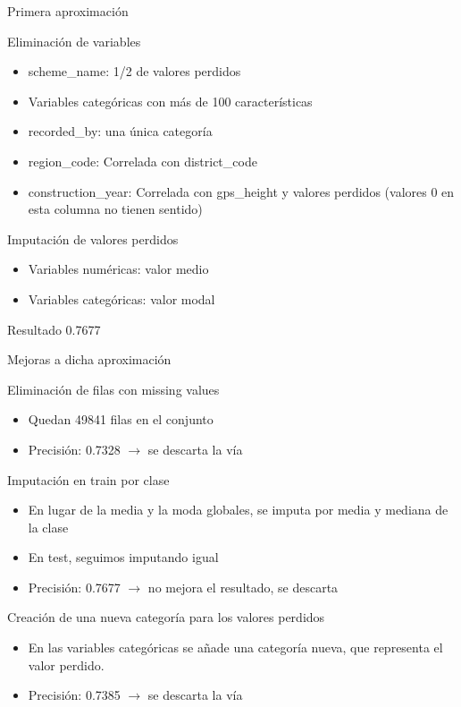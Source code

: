 \begin{frame}{Primera aproximación}
  \begin{block}{Eliminación de variables}
    \begin{itemize}
    \item scheme\_name: 1/2 de valores perdidos
    \item Variables categóricas con más de 100 características
    \item recorded\_by: una única categoría
    \item region\_code: Correlada con district\_code
    \item construction\_year: Correlada con gps\_height y valores perdidos
      (valores 0 en esta columna no tienen sentido)
    \end{itemize}
  \end{block}
  \begin{block}{Imputación de valores perdidos}
    \begin{itemize}
    \item Variables numéricas: valor medio
    \item Variables categóricas: valor modal
    \end{itemize}
  \end{block}
  \begin{block}{Resultado}
    0.7677
  \end{block}
\end{frame}

\begin{frame}{Mejoras a dicha aproximación}
  \begin{block}{Eliminación de filas con missing values}
    \begin{itemize}
    \item Quedan 49841 filas en el conjunto
    \item Precisión: 0.7328 $\rightarrow$ se descarta la vía
    \end{itemize}
  \end{block}
  \begin{block}{Imputación en train por clase}
    \begin{itemize}
    \item En lugar de la media y la moda globales, se imputa por media
      y mediana de la clase
    \item En test, seguimos imputando igual
    \item Precisión: 0.7677 $\rightarrow$ no mejora el resultado, se
      descarta
    \end{itemize}
  \end{block}
  \begin{block}{Creación de una nueva categoría para los valores perdidos}
    \begin{itemize}
    \item En las variables categóricas se añade una categoría nueva,
      que representa el valor perdido.
    \item Precisión: 0.7385 $\rightarrow$ se descarta la vía
    \end{itemize}
  \end{block}
\end{frame}

